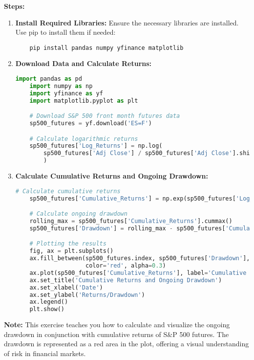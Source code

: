\documentclass{article}
\begin{document}
\textbf{Steps:}
\begin{enumerate}
    \item \textbf{Install Required Libraries:} Ensure the necessary libraries are installed. Use pip to install them if needed:
    \begin{verbatim}
    pip install pandas numpy yfinance matplotlib
    \end{verbatim}

    \item \textbf{Download Data and Calculate Returns:}
    \begin{lstlisting}[language=Python]
    import pandas as pd
    import numpy as np
    import yfinance as yf
    import matplotlib.pyplot as plt

    # Download S&P 500 front month futures data
    sp500_futures = yf.download('ES=F')

    # Calculate logarithmic returns
    sp500_futures['Log_Returns'] = np.log(
        sp500_futures['Adj Close'] / sp500_futures['Adj Close'].shift(1)
        )
    \end{lstlisting}

    \item \textbf{Calculate Cumulative Returns and Ongoing Drawdown:}
    \begin{lstlisting}[language=Python]
    # Calculate cumulative returns
    sp500_futures['Cumulative_Returns'] = np.exp(sp500_futures['Log_Returns'].cumsum()) - 1

    # Calculate ongoing drawdown
    rolling_max = sp500_futures['Cumulative_Returns'].cummax()
    sp500_futures['Drawdown'] = rolling_max - sp500_futures['Cumulative_Returns']

    # Plotting the results
    fig, ax = plt.subplots()
    ax.fill_between(sp500_futures.index, sp500_futures['Drawdown'], 
                    color='red', alpha=0.3)
    ax.plot(sp500_futures['Cumulative_Returns'], label='Cumulative Returns')
    ax.set_title('Cumulative Returns and Ongoing Drawdown')
    ax.set_xlabel('Date')
    ax.set_ylabel('Returns/Drawdown')
    ax.legend()
    plt.show()
    \end{lstlisting}
\end{enumerate}

\textbf{Note:} This exercise teaches you how to calculate and visualize the ongoing drawdown in conjunction with cumulative returns of S\&P 500 futures. The drawdown is represented as a red area in the plot, offering a visual understanding of risk in financial markets.
\end{document}
